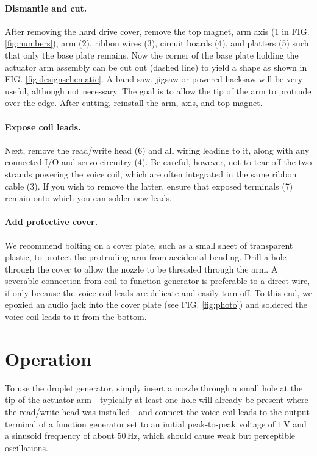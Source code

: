 \documentclass[aip,rsi,reprint,graphicx]{revtex4-1} %
\begin{document}
\paragraph{Dismantle and cut.} After removing the hard drive cover, remove
the top magnet, arm axis (1 in FIG. \ref{fig:numbers}), arm (2), ribbon wires (3), circuit boards (4), and
platters (5) such that only the base plate remains. Now the corner of the base plate holding
the actuator arm assembly can be cut out (dashed line) to yield a shape as shown in FIG.
\ref{fig:designschematic}. A band saw, jigsaw or powered hacksaw will be very
useful, although not necessary. The goal is to allow the tip of the arm to
protrude over the edge. After cutting, reinstall the arm, axis, and top magnet.

\paragraph{Expose coil leads.} Next, remove the read/write head (6) and all
wiring leading to it, along with any connected I/O and servo circuitry (4). Be
careful, however, not to tear off the two strands powering the voice coil, which
are often integrated in the same ribbon cable (3). If you wish to remove the
latter, ensure that exposed terminals (7) remain onto which you can solder new leads.

\paragraph{Add protective cover.} We recommend bolting on a cover plate, such
as a small sheet of transparent plastic, to protect the protruding arm from
accidental bending. Drill a hole through the cover to allow the nozzle to be
threaded through the arm. A severable
connection from coil to function generator is preferable to a direct wire, if
only because the voice coil leads are delicate and easily torn off. To this end, we epoxied
an audio jack into the cover plate (see FIG. \ref{fig:photo}) and soldered the voice coil leads to it from the
bottom.

\section{Operation}
To use the droplet generator, simply insert a nozzle through a small hole at the
tip of the actuator arm---typically at least one hole will already be present
where the read/write head was installed---and connect the voice coil leads to the output terminal of a function
generator set to an initial peak-to-peak voltage of $1\,$V and a sinusoid frequency of
about $50\,$Hz, which should cause weak but perceptible oscillations.
\end{document}
